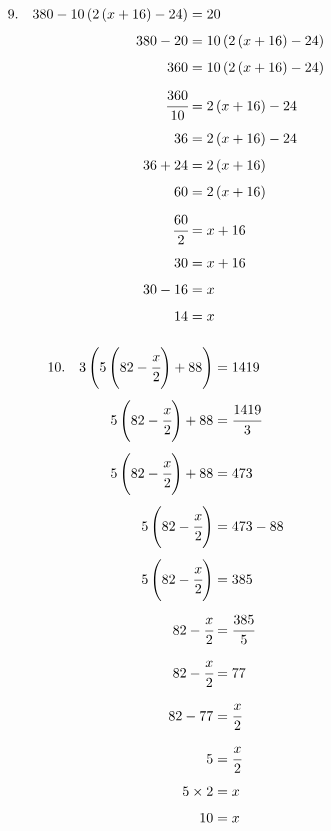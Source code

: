 \documentclass{article}
\begin{document}
\noindent
\begin{minipage}[t]{0.5000\textwidth}
\begin{align*}
9.\hspace{10pt}380-10\left(2\left(x+16\right)-24\right)&=20\\[4pt]
380-20&=10\left(2\left(x+16\right)-24\right)\\[4pt]
360&=10\left(2\left(x+16\right)-24\right)\\[4pt]
\cfrac{360}{10}&=2\left(x+16\right)-24\\[4pt]
36&=2\left(x+16\right)-24\\[4pt]
36+24&=2\left(x+16\right)\\[4pt]
60&=2\left(x+16\right)\\[4pt]
\cfrac{60}{2}&=x+16\\[4pt]
30&=x+16\\[4pt]
30-16&=x\\[4pt]
14&=x\\[4pt]
\end{align*}
\end{minipage}
\begin{minipage}[t]{0.5000\textwidth}
\begin{align*}
10.\hspace{10pt}3\left(5\left(82-\cfrac{x}{2}\right)+88\right)&=1419\\[4pt]
5\left(82-\cfrac{x}{2}\right)+88&=\cfrac{1419}{3}\\[4pt]
5\left(82-\cfrac{x}{2}\right)+88&=473\\[4pt]
5\left(82-\cfrac{x}{2}\right)&=473-88\\[4pt]
5\left(82-\cfrac{x}{2}\right)&=385\\[4pt]
82-\cfrac{x}{2}&=\cfrac{385}{5}\\[4pt]
82-\cfrac{x}{2}&=77\\[4pt]
82-77&=\cfrac{x}{2}\\[4pt]
5&=\cfrac{x}{2}\\[4pt]
5\times2&=x\\[4pt]
10&=x\\[4pt]
\end{align*}
\end{minipage}
\vspace{10 mm}
\end{document}
